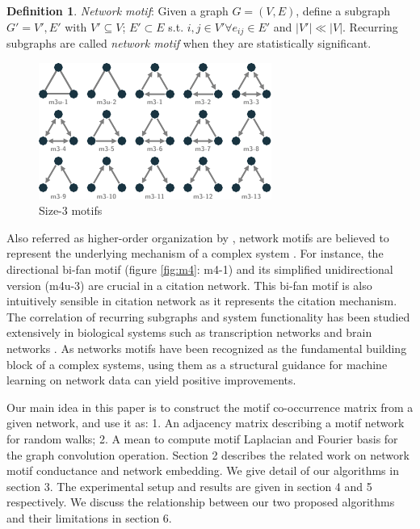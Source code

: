 \documentclass{article}
\theoremstyle{definition}
\newtheorem{definition}{Definition}[section]
\begin{document}
\begin{definition}{\emph{Network motif}}:
Given a graph $G = (V,E)$, define a subgraph $G' = {V', E'}$ with $V' 
\subseteq V$;
$E' \subset E$ s.t. $i,j \in V' \forall e_{ij} \in E'$ and $|V'| \ll |V|$. 
Recurring subgraphs are called \emph{network motif} when they are 
statistically significant.
\end{definition}

\begin{figure} 
    \centering
    \includegraphics[width=0.9\linewidth]{m3}
    \caption{Size-3 motifs}
    \label{fig:m3}
\end{figure}

Also referred as higher-order organization by \citeauthor{juremotif}, 
network motifs are believed to represent the underlying mechanism of a 
complex system 
\cite{netmotif,alon2006introduction,mangan2003structure}. 
For instance, the directional bi-fan motif (figure \ref{fig:m4}: m4-1)
and its simplified unidirectional version (m4u-3) are crucial in a citation 
network. This bi-fan motif is also intuitively sensible in citation network 
as it represents the citation mechanism. 
The correlation of recurring subgraphs and system 
functionality has been studied extensively in biological systems such as 
transcription networks \cite{mangan2003structure} and brain 
networks \cite{brainnetheuvel,honey2007network}. As networks motifs
have been recognized as the fundamental building block of a complex
systems, using them as a structural guidance for machine learning
on network data can yield positive improvements.

Our main idea in this paper is to construct the motif co-occurrence matrix
from a given network, and use it as: 1. An adjacency matrix describing a 
motif network for random walks; 2. A mean to compute motif Laplacian and 
Fourier basis for the graph convolution operation. Section 2 describes the 
related work on network motif conductance and network embedding. We give 
detail of our algorithms in section 3. The experimental setup and results 
are given in section 4 and 5 respectively. We discuss the relationship 
between our two proposed algorithms and their limitations in section 6.
\end{document}
